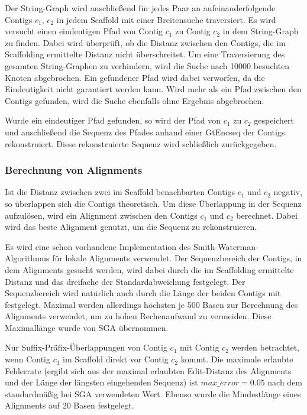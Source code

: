 \documentclass[a4paper,10pt,parskip]{scrartcl}
\begin{document}
Der String-Graph wird anschließend für jedes Paar an
aufeinanderfolgende Contigs $c_1$, $c_2$ in jedem Scaffold mit einer
Breitensuche traversiert. Es wird versucht einen eindeutigen Pfad von
Contig $c_1$ zu Contig $c_2$ in dem String-Graph zu finden. Dabei wird
überprüft, ob die Distanz zwischen den Contigs, die im Scaffolding
ermittelte Distanz nicht überschreitet. Um eine Traversierung des
gesamten String-Graphen zu verhindern, wird die Suche nach \num{10000}
besuchten Knoten abgebrochen. Ein gefundener Pfad wird dabei
verworfen, da die Eindeutigkeit nicht garantiert werden kann. Wird
mehr als ein Pfad zwischen den Contigs gefunden, wird die Suche
ebenfalls ohne Ergebnis abgebrochen.

Wurde ein eindeutiger Pfad gefunden, so wird der Pfad von $c_1$ zu
$c_2$ gespeichert und anschließend die Sequenz des Pfades anhand einer
GtEncseq der Contigs rekonstruiert. Diese rekonstruierte Sequenz wird
schließlich zurückgegeben.

\subsubsection{Berechnung von Alignments}
Ist die Distanz zwischen zwei im Scaffold benachbarten Contigs $c_1$
und $c_2$ negativ, so überlappen sich die Contigs theoretisch. Um
diese Überlappung in der Sequenz aufzulösen, wird ein Alignment
zwischen den Contigs $c_1$ und $c_2$ berechnet. Dabei wird das beste
Alignment genutzt, um die Sequenz zu rekonstruieren.

Es wird eine schon vorhandene Implementation des
Smith-Waterman-Algorithmus für lokale Alignments \cite{smith}
verwendet. Der Sequenzbereich der Contigs, in dem Alignments gesucht
werden, wird dabei durch die im Scaffolding ermittelte Distanz und das
dreifache der Standardabweichung festgelegt. Der Sequenzbereich wird
natürlich auch durch die Länge der beiden Contigs mit
festgelegt. Maximal werden allerdings höchsten je 500 Basen zur
Berechnung des Alignments verwendet, um zu hohen Rechenaufwand zu
vermeiden. Diese Maximallänge wurde von SGA übernommen.

Nur Suffix-Präfix-Überlappungen von Contig $c_1$ mit Contig $c_2$
werden betrachtet, wenn Contig $c_1$ im Scaffold direkt vor Contig
$c_2$ kommt. Die maximale erlaubte Fehlerrate (ergibt sich aus der
maximal erlaubten Edit-Distanz des Alignments und der Länge der
längsten eingehenden Sequenz) ist $max\_error = 0.05$ nach dem
standardmäßig bei SGA verwendeten Wert. Ebenso wurde die Mindestlänge
eines Alignments auf 20 Basen festgelegt.
\end{document}
